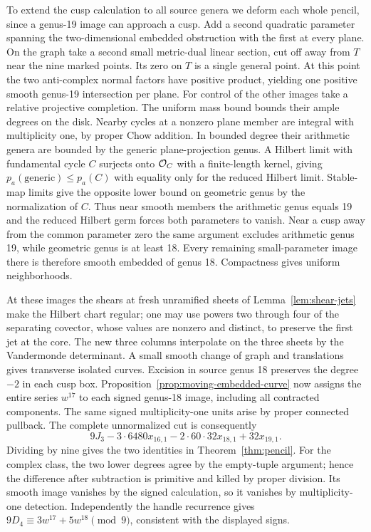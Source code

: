 To extend the cusp calculation to all source genera we deform each
whole pencil, since a genus-19 image can approach a cusp. Add a second
quadratic parameter spanning the two-dimensional embedded obstruction
with the first at every plane. On the graph take a second small
metric-dual linear section, cut off away from $T$ near the nine
marked points. Its zero on $T$ is a single general point. At this
point the two anti-complex normal factors have positive product,
yielding one positive smooth genus-19 intersection per plane.
For control of the other images take a relative projective completion.
The uniform mass bound bounds their ample degrees on the disk.
Nearby cycles at a nonzero plane member are integral with multiplicity
one, by proper Chow addition. In bounded degree their arithmetic
genera are bounded by the generic plane-projection genus. A Hilbert
limit with fundamental cycle $C$ surjects onto $\mathcal O_C$ with a
finite-length kernel, giving $p_a(\mathrm{generic})\le p_a(C)$
with equality only for the reduced Hilbert limit. Stable-map limits
give the opposite lower bound on geometric genus by the normalization
of $C$. Thus near smooth members the arithmetic genus equals 19 and
the reduced Hilbert germ forces both parameters to vanish. Near a cusp
away from the common parameter zero the same argument excludes
arithmetic genus 19, while geometric genus is at least 18.
Every remaining small-parameter image there is therefore smooth
embedded of genus 18. Compactness gives uniform neighborhoods.

At these images the shears at fresh unramified sheets of
Lemma~\ref{lem:shear-jets} make the Hilbert chart regular; one may use
powers two through four of the separating covector, whose values are
nonzero and distinct, to preserve the first jet at the core. The new
three columns interpolate on the three sheets by the Vandermonde
determinant. A small smooth change of graph and translations gives
transverse isolated curves. Excision in source genus 18 preserves the
degree $-2$ in each cusp box. Proposition~\ref{prop:moving-embedded-curve}
now assigns the entire series $w^{17}$ to each signed genus-18 image,
including all contracted components. The same signed multiplicity-one
units arise by proper connected pullback. The complete unnormalized
cut is consequently
\[
 9J_3-3\cdot6480x_{16,1}-2\cdot60\cdot32x_{18,1}+32x_{19,1}.
\]
Dividing by nine gives the two identities in Theorem~\ref{thm:pencil}.
For the complex class, the two lower degrees agree by the empty-tuple
argument; hence the difference after subtraction is primitive and
killed by proper division. Its smooth image vanishes by the signed
calculation, so it vanishes by multiplicity-one detection.
Independently the handle recurrence gives
$9D_4\equiv3w^{17}+5w^{18}\pmod9$, consistent with the displayed signs.
